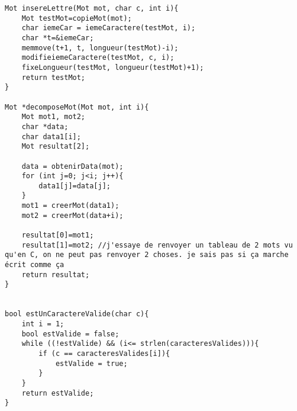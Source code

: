 \documentclass{report}
\begin{document}
\begin{lstlisting}
Mot insereLettre(Mot mot, char c, int i){
    Mot testMot=copieMot(mot);
    char iemeCar = iemeCaractere(testMot, i);
    char *t=&iemeCar;
    memmove(t+1, t, longueur(testMot)-i);
    modifieiemeCaractere(testMot, c, i);
    fixeLongueur(testMot, longueur(testMot)+1);
    return testMot;
}

Mot *decomposeMot(Mot mot, int i){
    Mot mot1, mot2;
    char *data;
    char data1[i];
    Mot resultat[2];

    data = obtenirData(mot);
    for (int j=0; j<i; j++){
        data1[j]=data[j];
    }
    mot1 = creerMot(data1);
    mot2 = creerMot(data+i);

    resultat[0]=mot1;
    resultat[1]=mot2; //j'essaye de renvoyer un tableau de 2 mots vu qu'en C, on ne peut pas renvoyer 2 choses. je sais pas si ça marche écrit comme ça
    return resultat;
}


bool estUnCaractereValide(char c){
    int i = 1;
    bool estValide = false;
    while ((!estValide) && (i<= strlen(caracteresValides))){
        if (c == caracteresValides[i]){
            estValide = true;
        }
    }
    return estValide;
}
 

\end{lstlisting}
 
\end{document}
